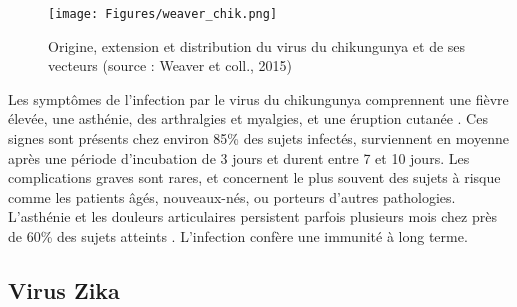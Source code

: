 \begin{figure}[t]
	\centering
	\texttt{[image: Figures/weaver\_chik.png]}
	\caption{Origine, extension et distribution du virus du chikungunya et de ses vecteurs (source : Weaver et coll., 2015)}
	\label{fig:chikworld}
\end{figure}

Les symptômes de l'infection par le virus du chikungunya comprennent une fièvre élevée, une asthénie, des arthralgies et myalgies, et une éruption cutanée \cite{weaver2015chikungunya}. 
Ces signes sont présents chez environ 85\% des sujets infectés, surviennent en moyenne après une période d'incubation de 3 jours et durent entre 7 et 10 jours.
Les complications graves sont rares, et concernent le plus souvent des sujets à risque comme les patients âgés, nouveaux-nés, ou porteurs d'autres pathologies.
L'asthénie et les douleurs articulaires persistent parfois plusieurs mois chez près de 60\% des sujets atteints \cite{schilte2013chikungunya}.
L'infection confère une immunité à long terme. 


\subsection{Virus Zika}

